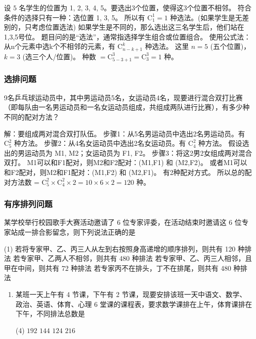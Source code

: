 \begin{solution}
    设 $5$ 名学生的位置为 1, 2, 3, 4, 5。要选出3个位置，使得这3个位置不相邻。
    符合条件的选择只有一种：选位置 1, 3, 5。
    所以有 $\mathrm{C}_{1}^{1} = 1$ 种选法。(如果学生是无差别的，只考虑位置选法)
    如果学生是不同的，那么选出这三名学生后，他们站在1,3,5号位。
    题目问的是“选法”，通常指选择学生组合或位置组合。
    使用公式法：从n个元素中选k个不相邻的元素，有 $\mathrm{C}_{n-k+1}^{k}$ 种选法。
    这里 $n=5$ (五个位置)，$k=3$ (选三个人/位置)。
    种数 $= \mathrm{C}_{5-3+1}^{3} = \mathrm{C}_{3}^{3} = 1$ 种。
\end{solution}

\subsubsection{选排问题}
\begin{example}
    9名乒乓球运动员中，其中男运动员5名，女运动员4名，现要进行混合双打比赛（即每队由一名男运动员和一名女运动员组成，共组成两队进行比赛），有多少种不同的配对方法？
\end{example}
\begin{solution}
    解：要组成两对混合双打队伍。
    步骤1：从5名男运动员中选出2名男运动员。有 $\mathrm{C}_{5}^{2}$ 种方法。
    步骤2：从4名女运动员中选出2名女运动员。有 $\mathrm{C}_{4}^{2}$ 种方法。
    假设选出的男运动员为 M1, M2；女运动员为 F1, F2。
    步骤3：将这2男2女组成两对混合双打。
    M1可以和F1配对，则M2和F2配对：(M1,F1) 和 (M2,F2)。
    或者M1可以和F2配对，则M2和F1配对：(M1,F2) 和 (M2,F1)。
    有2种配对方式。
    所以总的配对方法数 = $\mathrm{C}_{5}^{2} \times \mathrm{C}_{4}^{2} \times 2 = 10 \times 6 \times 2 = 120$ 种。
\end{solution}

\subsubsection{有序排列问题}

\begin{example}
    某学校举行校园歌手大赛活动邀请了 6 位专家评委，在活动结束时邀请这 6 位专家站成一排合影留念，则下列说法正确的是
    \begin{tasks}(1) %
        \task 若将专家甲、乙、丙三人从左到右按照身高递增的顺序排列，则共有 120 种排法
        \task 若专家甲、乙两人不相邻，则共有 480 种排法
        \task 若专家甲、乙、丙三人相邻，且甲在中间，则共有 72 种排法
        \task 若专家丙不在排头，丁不在排尾，则共有 480 种排法
    \end{tasks}
\end{example}

\begin{enumerate}
    \item 某班一天上午有 4 节课，下午有 2 节课，现要安排该班一天中语文、数学、政治、英语、体育、心理 6 堂课的课程表，要求数学课排在上午，体育课排在下午，不同排法总数是
          \begin{tasks}(4)
              \task $192$
              \task $144$
              \task $124$
              \task $216$
          \end{tasks}
\end{enumerate}

